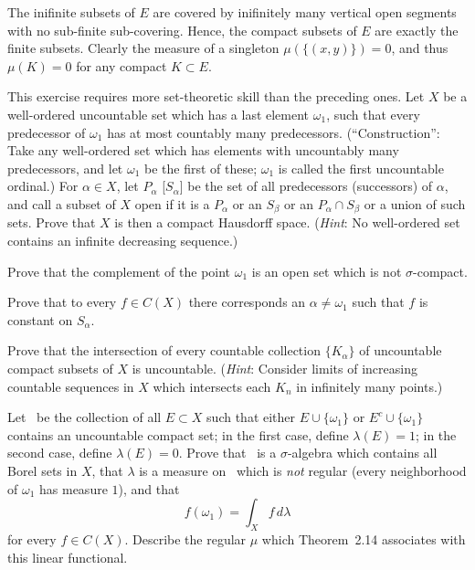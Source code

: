 \begin{enumerate}
The inifinite subsets of $E$
are covered by inifinitely many vertical open segments
with no sub-finite sub-covering.
Hence, the compact subsets of $E$ are exactly the finite subsets.
Clearly the measure of a singleton \(\mu(\{(x,y)\}) = 0\),
and thus \(\mu(K)=0\) for any compact \(K\subset E\).



\begin{excopy}
This exercise requires more set-theoretic skill than the preceding
ones.  Let $X$ be a well-ordered uncountable set which has a last
element \(\omega_1\), such that every predecessor of \(\omega_1\) has
at most countably many predecessors.
(``Construction'': Take any well-ordered set which has elements with uncountably
many predecessors, and let \(\omega_1\) be the first of these;
\(\omega_1\) is called the first uncountable ordinal.)
For \(\alpha\in X\), let \(P_\alpha\) [\(S_\alpha\)] be the set of all
predecessors (successors) of \(\alpha\),
and call a subset of $X$ open if it is
a \(P_\alpha\) or an \( S_\beta\)
or an  \(P_\alpha \cap S_\beta\)
or a union of such sets.
Prove that $X$ is then a compact Hausdorff space.
(\emph{Hint}: No well-ordered set contains an infinite decreasing sequence.)

Prove that the complement of the point \(\omega_1\) is an open set
which is not \(\sigma\)-compact.

Prove that to every \(f\in C(X)\)  there corresponds an \(\alpha \neq \omega_1\)
such that $f$ is constant on \(S_\alpha\).

Prove that the intersection of every countable collection \(\{K_\alpha\}\)
of uncountable compact subsets of $X$ is uncountable.
(\emph{Hint}: Consider limits of increasing countable sequences in $X$ which
intersects each \(K_n\) in infinitely many points.)

Let \frakM\ be the collection of all \(E\subset X\) such that either
\(E\cup \{\omega_1\}\) or
\(E^c\cup \{\omega_1\}\) contains an uncountable compact set; in the first case,
define \(\lambda(E)=1\); in the second case, define \(\lambda(E) = 0\).
Prove that \frakM\ is a \(\sigma\)-algebra which contains all Borel sets
in $X$, that \(\lambda\) is a measure on \frakM\ which is \emph{not}
regular (every neighborhood of \(\omega_1\) has measure $1$), and that
\begin{equation*}
 f(\omega_1) = \int_X f\, d\lambda
\end{equation*}
for every \(f\in C(X)\). Describe the regular \(\mu\) which Theorem~2.14
associates with this linear functional.
\end{excopy}



\end{enumerate}

